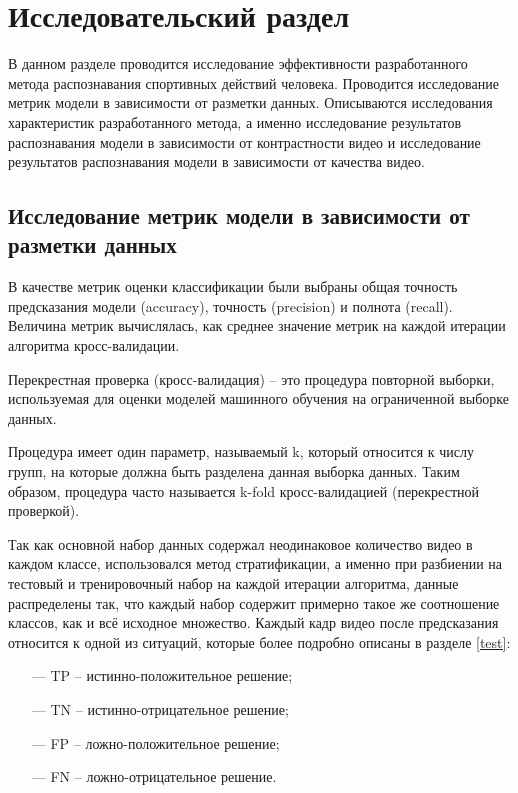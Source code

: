 \chapter{Исследовательский раздел}
В данном разделе проводится исследование эффективности разработанного метода распознавания спортивных действий человека. Проводится исследование метрик модели в зависимости от разметки данных. Описываются исследования характеристик разработанного метода, а именно исследование результатов распознавания модели в зависимости от контрастности видео и исследование результатов распознавания модели в зависимости от качества видео.

\section{Исследование метрик модели в зависимости от разметки данных}

В качестве метрик оценки классификации были выбраны общая точность предсказания модели (accuracy), точность (precision) и полнота (recall).
Величина метрик вычислялась, как среднее значение метрик на каждой итерации алгоритма кросс-валидации.

Перекрестная проверка (кросс-валидация) -- это процедура повторной выборки, используемая для оценки моделей машинного обучения на ограниченной выборке данных.

Процедура имеет один параметр, называемый k, который относится к числу групп, на которые должна быть разделена данная выборка данных. Таким образом, процедура часто называется  k-fold кросс-валидацией (перекрестной проверкой).

 Так как основной набор данных содержал неодинаковое количество видео в каждом классе, использовался метод стратификации, а именно при разбиении на тестовый и тренировочный набор на каждой итерации алгоритма, данные распределены так, что каждый набор содержит примерно такое же соотношение классов, как и всё исходное множество. Каждый кадр видео после предсказания относится к одной из ситуаций, которые более подробно описаны в разделе \ref{test}:


\begin{itemize}
	\item[---]  TP -- истинно-положительное решение;
	\item[---] TN -- истинно-отрицательное решение;
	\item[---]  FP -- ложно-положительное решение;
	\item[---]  FN -- ложно-отрицательное решение.

\end{itemize}

